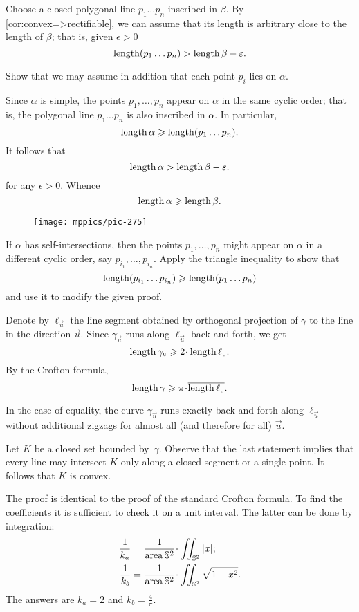 \begin{multicols}{2}
Choose a closed polygonal line $p_1\dots p_n$ inscribed in $\beta$.
By \ref{cor:convex=>rectifiable}, we can assume that its length is arbitrary close to the length of $\beta$;
that is, given $\epsilon>0$ 
\[\mathop{\rm length}\nolimits (p_1\dots p_n)>\mathop{\rm length}\nolimits\beta-\varepsilon.\]

Show that we may assume in addition that each point $p_i$ lies on $\alpha$.

Since $\alpha$ is simple, the points $p_1,\dots,p_n$ appear on $\alpha$ in the same cyclic order;
that is, the polygonal line $p_1\dots p_n$ is also inscribed in $\alpha$.
In particular,
\[\mathop{\rm length}\nolimits\alpha\geqslant \mathop{\rm length}\nolimits (p_1\dots p_n).\]
It follows that 
\[\mathop{\rm length}\nolimits\alpha>\mathop{\rm length}\nolimits\beta-\varepsilon.\]
for any $\epsilon>0$.
Whence 
\[\mathop{\rm length}\nolimits\alpha\geqslant\mathop{\rm length}\nolimits\beta.\]

\begin{wrapfigure}{r}{25 mm}
\vskip-6mm
\centering
\texttt{[image: mppics/pic-275]}
\vskip0mm
\end{wrapfigure}

If $\alpha$ has self-intersections, then the points $p_1,\dots, p_n$ might appear on $\alpha$ in a different cyclic order, say $p_{i_1},\dots,p_{i_n}$.
Apply the triangle inequality to show that 
\[\mathop{\rm length}\nolimits(p_{i_1}\dots p_{i_n})\geqslant \mathop{\rm length}\nolimits (p_1\dots p_n)\]
and use it to modify the given proof.



Denote by $\ell_{\vec u}$ the line segment 
obtained by orthogonal projection of $\gamma$ to the line in the direction ${\vec u}$.
Since $\gamma_{\vec u}$ runs along $\ell_{\vec u}$ back and forth, we get 
\[\length\gamma_{\vec u}\ge 2\cdot\length\ell_{\vec u}.\]
By the Crofton formula, 
\[\length\gamma\ge \pi\cdot \overline{\length\ell_{\vec u}}.\]

In the case of equality, the curve $\gamma_{\vec u}$ runs exactly back and forth along $\ell_{\vec u}$ without additional zigzags for almost all (and therefore for all) ${\vec u}$.

Let $K$ be a closed set bounded by~$\gamma$.
Observe that the last statement implies that every line may intersect $K$ only along a closed segment or a single point.
It follows that $K$ is convex.

The proof is identical to the proof of the standard Crofton formula.
To find the coefficients it is sufficient to check it on a unit interval.
The latter can be done by integration:
\begin{align*}
\frac1{k_a}&=\frac{1}{\area \mathbb{S}^2}\cdot\iint_{\mathbb{S}^2} |x|;
\\
\frac1{k_b}&=\frac{1}{\area \mathbb{S}^2}\cdot\iint_{\mathbb{S}^2} \sqrt{1-x^2}.
\end{align*}
The answers are $k_a=2$ and $k_b=\tfrac4\pi$.


\end{multicols}
